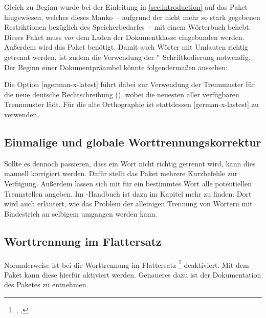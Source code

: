 \documentclass[%
  english,ngerman,%
  geometry=no,DIV=12,automark,%
]{tudscrartcl}
\begin{document}
Gleich zu Beginn wurde bei der Einleitung in \autoref{sec:introduction} auf das 
Paket  hingewiesen, welches dieses Manko~-- aufgrund der 
nicht mehr so stark gegebenen Restriktionen bezüglich des Speicherbedarfes~-- 
mit einem Wörterbuch behebt. Dieses Paket muss \emph{vor} dem Laden der 
Dokumentklasse eingebunden werden. Außerdem wird das Paket  
benötigt. Damit auch Wörter mit Umlauten richtig getrennt werden, ist zudem die 
Verwendung der "~Schriftkodierung notwendig. Der Beginn einer 
Dokumentpräambel könnte folgendermaßen aussehen:
%
%
Die Option [ngerman-x-latest] führt dabei zur Verwendung der 
Trennmuster für die neue deutsche Rechtschreibung (), wobei 
 die neuesten aller verfügbaren Trennmuster lädt. Für 
die alte Orthographie ist stattdessen [german-x-lastest] zu 
verwenden.


\subsection{Einmalige und globale Worttrennungskorrektur}
Sollte es dennoch passieren, dass ein Wort nicht richtig getrennt wird, kann 
dies manuell korrigiert werden. Dafür stellt das Paket  mehrere 
Kurzbefehle zur Verfügung. Außerdem lassen sich mit  für ein 
bestimmtes Wort alle potentiellen Trennstellen angeben. Im \TUDScript-Handbuch
ist dazu im Kapitel  mehr 
zu finden. Dort wird auch erläutert, wie das Problem der alleinigen Trennung 
von Wörtern mit Bindestrich an selbigem umgangen werden kann.


\subsection{Worttrennung im Flattersatz}
Normalerweise ist bei  die Worttrennung im Flattersatz%
\footnote{, , } deaktiviert. 
Mit dem Paket  kann diese hierfür aktiviert werden. Genaueres 
dazu ist der Dokumentation des Paketes zu entnehmen.
\end{document}
